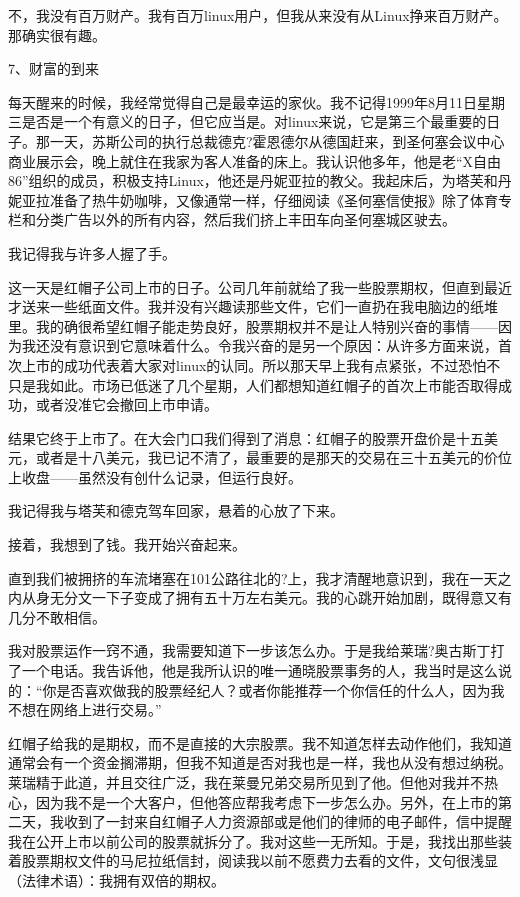 不，我没有百万财产。我有百万linux用户，但我从来没有从Linux挣来百万财产。那确实很有趣。

 
7、财富的到来

每天醒来的时候，我经常觉得自己是最幸运的家伙。我不记得1999年8月11日星期三是否是一个有意义的日子，但它应当是。对linux来说，它是第三个最重要的日子。那一天，苏斯公司的执行总裁德克?霍恩德尔从德国赶来，到圣何塞会议中心商业展示会，晚上就住在我家为客人准备的床上。我认识他多年，他是老“X自由86”组织的成员，积极支持Linux，他还是丹妮亚拉的教父。我起床后，为塔芙和丹妮亚拉准备了热牛奶咖啡，又像通常一样，仔细阅读《圣何塞信使报》除了体育专栏和分类广告以外的所有内容，然后我们挤上丰田车向圣何塞城区驶去。

我记得我与许多人握了手。

这一天是红帽子公司上市的日子。公司几年前就给了我一些股票期权，但直到最近才送来一些纸面文件。我并没有兴趣读那些文件，它们一直扔在我电脑边的纸堆里。我的确很希望红帽子能走势良好，股票期权并不是让人特别兴奋的事情——因为我还没有意识到它意味着什么。令我兴奋的是另一个原因：从许多方面来说，首次上市的成功代表着大家对linux的认同。所以那天早上我有点紧张，不过恐怕不只是我如此。市场已低迷了几个星期，人们都想知道红帽子的首次上市能否取得成功，或者没准它会撤回上市申请。

结果它终于上市了。在大会门口我们得到了消息：红帽子的股票开盘价是十五美元，或者是十八美元，我已记不清了，最重要的是那天的交易在三十五美元的价位上收盘——虽然没有创什么记录，但运行良好。

我记得我与塔芙和德克驾车回家，悬着的心放了下来。

接着，我想到了钱。我开始兴奋起来。

直到我们被拥挤的车流堵塞在101公路往北的?上，我才清醒地意识到，我在一天之内从身无分文一下子变成了拥有五十万左右美元。我的心跳开始加剧，既得意又有几分不敢相信。

我对股票运作一窍不通，我需要知道下一步该怎么办。于是我给莱瑞?奥古斯丁打了一个电话。我告诉他，他是我所认识的唯一通晓股票事务的人，我当时是这么说的：“你是否喜欢做我的股票经纪人？或者你能推荐一个你信任的什么人，因为我不想在网络上进行交易。”

红帽子给我的是期权，而不是直接的大宗股票。我不知道怎样去动作他们，我知道通常会有一个资金搁滞期，但我不知道是否对我也是一样，我也从没有想过纳税。莱瑞精于此道，并且交往广泛，我在莱曼兄弟交易所见到了他。但他对我并不热心，因为我不是一个大客户，但他答应帮我考虑下一步怎么办。另外，在上市的第二天，我收到了一封来自红帽子人力资源部或是他们的律师的电子邮件，信中提醒我在公开上市以前公司的股票就拆分了。我对这些一无所知。于是，我找出那些装着股票期权文件的马尼拉纸信封，阅读我以前不愿费力去看的文件，文句很浅显（法律术语）：我拥有双倍的期权。

